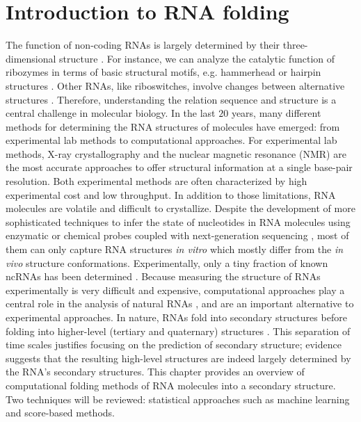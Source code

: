 \chapter{Introduction to RNA folding}\label{ch:folding}
The function of non-coding RNAs is largely determined by their three-dimensional structure \cite{cech2014noncoding}. For instance, we can analyze the catalytic function of ribozymes in terms of basic structural motifs, e.g. hammerhead or hairpin structures \cite{doherty2001ribozyme}. Other RNAs, like riboswitches, involve changes between alternative structures  \cite{vitreschak04_ribos}. Therefore, understanding the relation sequence and structure is a central challenge in molecular biology. In the last $20$ years, many different methods for determining the RNA structures of molecules have emerged: from experimental lab methods to computational approaches. For experimental lab methods, X-ray crystallography and the nuclear magnetic resonance (NMR)  are the most accurate approaches to offer structural information at a single base-pair resolution. Both experimental methods are often characterized by high experimental cost and low throughput. In addition to those limitations, RNA molecules are volatile and difficult to crystallize. Despite the development of more sophisticated techniques to infer the state of nucleotides in RNA molecules using enzymatic \cite{kertesz2010genome, underwood2010fragseq} or chemical probes \cite{tijerina2007dms, wilkinson2006selective} coupled with next-generation sequencing \cite{bevilacqua2016genome, tian2016rna}, most of them can only capture RNA structures \textit{in vitro} which mostly differ from the \textit{in vivo} structure conformations. Experimentally, only a tiny fraction of known ncRNAs has been determined \cite{rnacentral2017rnacentral}. Because measuring the structure of RNAs experimentally is very difficult and expensive, computational approaches play a central role in the analysis of natural RNAs \cite{seetin2012rna, fallmann2017recent}, and are an important alternative to experimental approaches. In nature, RNAs fold into secondary structures before folding into higher-level (tertiary and quaternary) structures \cite{brion1997hierarchy,tinoco1999rna}. This separation of time scales justifies focusing on the prediction of secondary structure; evidence suggests that the resulting high-level structures are indeed largely determined by the RNA's secondary structures. This chapter provides an overview of computational folding methods of RNA molecules into a secondary structure. Two techniques will be reviewed: statistical approaches such as machine learning and score-based methods.

